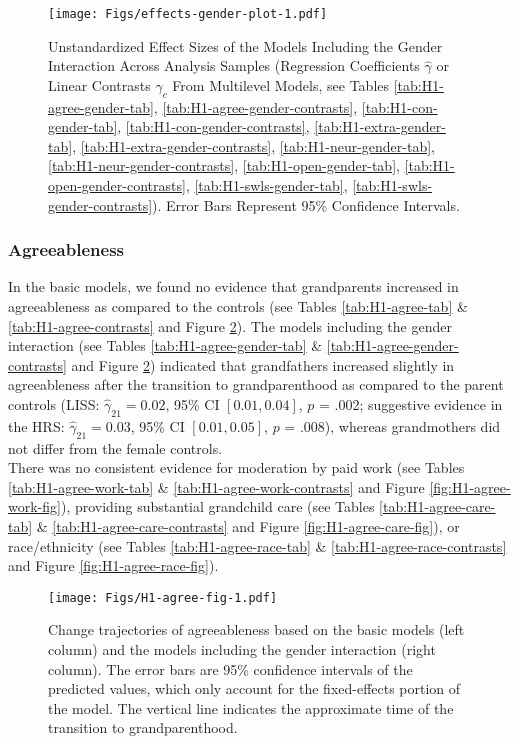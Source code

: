 \documentclass[
  english,
  man,floatsintext]{apa7}
\begin{document}
\begin{figure}
\centering
\texttt{[image: Figs/effects-gender-plot-1.pdf]}
\caption{\label{fig:effects-gender-plot}Unstandardized Effect Sizes of the Models Including the Gender Interaction Across Analysis Samples (Regression Coefficients \(\hat{\gamma}\) or Linear Contrasts \(\hat{\gamma}_{c}\) From Multilevel Models, see Tables \ref{tab:H1-agree-gender-tab}, \ref{tab:H1-agree-gender-contrasts}, \ref{tab:H1-con-gender-tab}, \ref{tab:H1-con-gender-contrasts}, \ref{tab:H1-extra-gender-tab}, \ref{tab:H1-extra-gender-contrasts}, \ref{tab:H1-neur-gender-tab}, \ref{tab:H1-neur-gender-contrasts}, \ref{tab:H1-open-gender-tab}, \ref{tab:H1-open-gender-contrasts}, \ref{tab:H1-swls-gender-tab}, \ref{tab:H1-swls-gender-contrasts}). Error Bars Represent 95\% Confidence Intervals.}
\end{figure}

\hypertarget{agreeableness}{%
\subsubsection{Agreeableness}\label{agreeableness}}

In the basic models, we found no evidence that grandparents increased in agreeableness as compared to the controls (see Tables \ref{tab:H1-agree-tab} \& \ref{tab:H1-agree-contrasts} and Figure \ref{fig:H1-agree-fig}). The models including the gender interaction (see Tables \ref{tab:H1-agree-gender-tab} \& \ref{tab:H1-agree-gender-contrasts} and Figure \ref{fig:H1-agree-fig}) indicated that grandfathers increased slightly in agreeableness after the transition to grandparenthood as compared to the parent controls (LISS: \(\hat{\gamma}_{21} = 0.02\), 95\% CI \([0.01, 0.04]\), \(p\) = .002; suggestive evidence in the HRS: \(\hat{\gamma}_{21} = 0.03\), 95\% CI \([0.01, 0.05]\), \(p\) = .008), whereas grandmothers did not differ from the female controls.\\
There was no consistent evidence for moderation by paid work (see Tables \ref{tab:H1-agree-work-tab} \& \ref{tab:H1-agree-work-contrasts} and Figure \ref{fig:H1-agree-work-fig}), providing substantial grandchild care (see Tables \ref{tab:H1-agree-care-tab} \& \ref{tab:H1-agree-care-contrasts} and Figure \ref{fig:H1-agree-care-fig}), or race/ethnicity (see Tables \ref{tab:H1-agree-race-tab} \& \ref{tab:H1-agree-race-contrasts} and Figure \ref{fig:H1-agree-race-fig}).



\begin{figure}
\centering
\texttt{[image: Figs/H1-agree-fig-1.pdf]}
\caption{\label{fig:H1-agree-fig}Change trajectories of agreeableness based on the basic models (left column) and the models including the gender interaction (right column). The error bars are 95\% confidence intervals of the predicted values, which only account for the fixed-effects portion of the model. The vertical line indicates the approximate time of the transition to grandparenthood.}
\end{figure}
\end{document}

